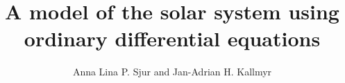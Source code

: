 \documentclass[a4paper, 11pt, twocolumn]{article}
\begin{document}
\title{A model of the solar system using ordinary differential equations}

\author{Anna Lina P. Sjur and Jan-Adrian H. Kallmyr}

\twocolumn[
  \begin{@twocolumnfalse}
    \maketitle
    
  \end{@twocolumnfalse}
]













%
\end{document}
